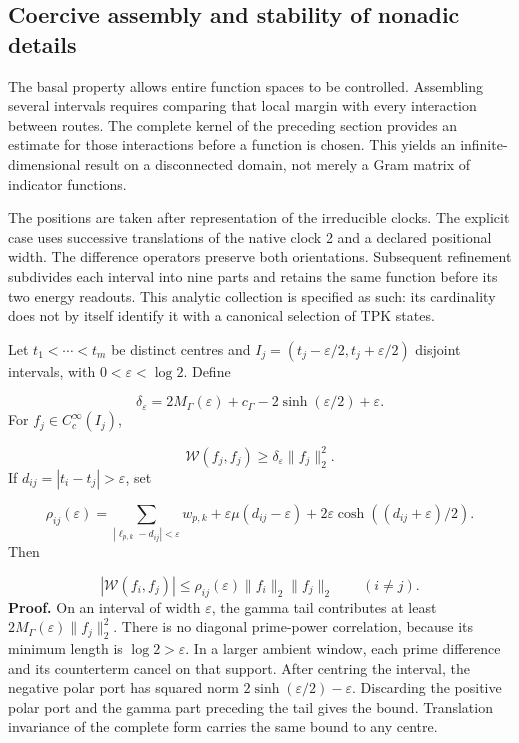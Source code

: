 \subsection{Coercive assembly and stability of nonadic details}
\label{rz:ensamblaje}
The basal property allows entire function spaces to be controlled. Assembling several intervals requires comparing that local margin with every interaction between routes. The complete kernel of the preceding section provides an estimate for those interactions before a function is chosen. This yields an infinite-dimensional result on a disconnected domain, not merely a Gram matrix of indicator functions.

The positions are taken after representation of the irreducible clocks. The explicit case uses successive translations of the native clock 2 and a declared positional width. The difference operators preserve both orientations. Subsequent refinement subdivides each interval into nine parts and retains the same function before its two energy readouts. This analytic collection is specified as such: its cardinality does not by itself identify it with a canonical selection of TPK states.

Let \(t_1<\cdots<t_m\) be distinct centres and \(I_j=(t_j-\varepsilon/2,t_j+\varepsilon/2)\) disjoint intervals, with \(0<\varepsilon<\log2\). Define

\[
\delta_\varepsilon=2M_\Gamma(\varepsilon)+c_\Gamma
-2\sinh(\varepsilon/2)+\varepsilon.
\]
For \(f_j\in C_c^\infty(I_j)\),

\[
\mathscr W(f_j,f_j)\geq\delta_\varepsilon\|f_j\|_2^2.
\]
If \(d_{ij}=|t_i-t_j|>\varepsilon\), set

\[
\rho_{ij}(\varepsilon)=
\sum_{|\ell_{p,k}-d_{ij}|<\varepsilon}w_{p,k}
+\varepsilon\mu(d_{ij}-\varepsilon)
+2\varepsilon\cosh((d_{ij}+\varepsilon)/2).
\]
Then

\[
|\mathscr W(f_i,f_j)|
\leq\rho_{ij}(\varepsilon)\|f_i\|_2\|f_j\|_2
\qquad(i\neq j).
\]
\textbf{Proof.} On an interval of width \(\varepsilon\), the gamma tail contributes at least \(2M_\Gamma(\varepsilon)\|f_j\|_2^2\). There is no diagonal prime-power correlation, because its minimum length is \(\log2>\varepsilon\). In a larger ambient window, each prime difference and its counterterm cancel on that support. After centring the interval, the negative polar port has squared norm \(2\sinh(\varepsilon/2)-\varepsilon\). Discarding the positive polar port and the gamma part preceding the tail gives the bound. Translation invariance of the complete form carries the same bound to any centre.

